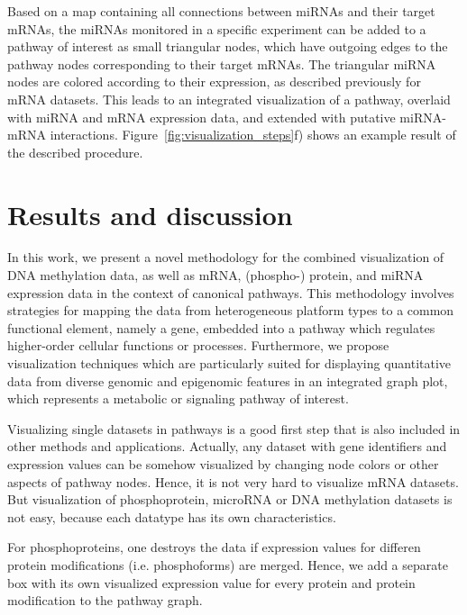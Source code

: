 \documentclass{bioinfo}
\begin{document}
Based on a map containing all connections between miRNAs and their target mRNAs, the miRNAs
monitored in a specific experiment can be added to a pathway of interest as small triangular nodes,
which have outgoing edges to the pathway nodes corresponding to their target mRNAs. The triangular
miRNA nodes are colored according to their expression, as described previously for mRNA datasets.
This leads to an integrated visualization of a pathway, overlaid with miRNA and mRNA expression
data, and extended with putative miRNA-mRNA interactions. Figure~\ref{fig:visualization_steps}f)
shows an example result of the described procedure.


\section{Results and discussion}

In this work, we present a novel methodology for the combined visualization of DNA methylation data, 
as well as mRNA, (phospho-) protein, and miRNA expression data in the context of canonical pathways. 
This methodology involves strategies for mapping the data from heterogeneous platform types to a common
functional element, namely a gene, embedded into a pathway which regulates higher-order cellular 
functions or processes. Furthermore, we propose visualization techniques which are particularly suited for 
displaying quantitative data from diverse genomic and epigenomic features in an integrated graph plot,  
which represents a metabolic or signaling pathway of interest.

Visualizing single datasets in pathways is a good first step that is also included
in other methods and applications. Actually, any dataset with gene identifiers and expression values
can be somehow visualized by changing node colors or other aspects of pathway nodes. Hence, it is
not very hard to visualize mRNA datasets. But visualization of phosphoprotein, microRNA or DNA
methylation datasets is not easy, because each datatype has its own characteristics.

For phosphoproteins, one destroys the data if expression values for differen protein modifications
(i.e. phosphoforms) are merged. Hence, we add a separate box with its own visualized expression
value for every protein and protein modification to the pathway graph.
\end{document}
